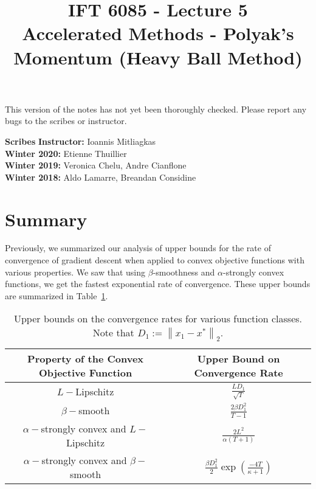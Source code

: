 \documentclass{article}
\title{IFT 6085 - Lecture 5 \\ 
Accelerated Methods - Polyak's Momentum (Heavy Ball Method) }
\date{}
\newcommand\norm[1]{\left\lVert#1\right\rVert}
\begin{document}
 

\maketitle

\vspace{-0.5in}
\begin{center}
This version of the notes has not yet been thoroughly checked.
Please report any bugs to the scribes or instructor.
\end{center}
\vspace{0.2in}

\textbf{Scribes}\hfill
\textbf{Instructor:}  Ioannis Mitliagkas\\
\textbf{Winter 2020:} Etienne Thuillier\\
\textbf{Winter 2019:} Veronica Chelu, Andre Cianflone\\
\textbf{Winter 2018:} Aldo Lamarre, Breandan Considine



\newcommand{\infgc}{\inf_{g \in \mathcal{C}}}
\newcommand{\supgc}{\sup_{g \in \mathcal{C}}}

\newcommand{\Prob}{\mathbb{P}}
\newcommand{\E}{\mathbb{E}}
\newcommand{\reals}{\mathbb{R}}


\section{Summary}

Previously, we summarized our analysis of upper bounds for the rate of convergence of gradient descent when applied to convex objective functions with various properties. 
We saw that using $\beta$-smoothness and $\alpha$-strongly convex functions, we get the fastest exponential rate of convergence.  
These upper bounds are summarized in Table~\ref{tab:upper_bounds}.
\begin{table}[H]
\centering
    {
    \renewcommand{\arraystretch}{2.0}
    \begin{tabular}{cc}
    \toprule
		\textbf{Property of the Convex Objective Function} 
		& 
		\textbf{Upper Bound on Convergence Rate}
		\\
	\toprule
		$L-$Lipschitz & $ \frac{L D_1}{\sqrt{T}}$
	\\
		$\beta-$smooth & $ \frac{2 \beta D^2_1 }{T - 1}$
	\\
		$\alpha-$strongly convex and $L-$Lipschitz & $ \frac{2 L^2}{\alpha \left(T+1\right)}$
	\\
		$\alpha-$strongly convex and $\beta-$smooth & $ \frac{\beta D^2_1}{2} \exp({\frac{-4T}{\kappa + 1}})$
		\\
	\bottomrule
	\end{tabular}
	}
\caption{
    Upper bounds on the convergence rates for various function classes. Note that $D_1 := \norm{x_1 - x^*}_2$.
}
\label{tab:upper_bounds}
\end{table}
\end{document}
